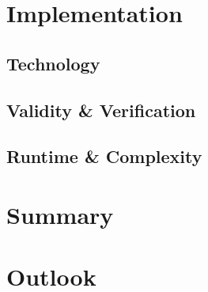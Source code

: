 \section{Implementation}
\subsection{Technology}
\subsection{Validity \& Verification}
\subsection{Runtime \& Complexity}

\section{Summary}
\section{Outlook}
\label{subsec:secgoal}